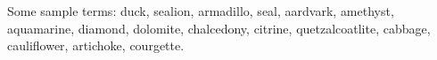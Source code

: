 \documentclass[12pt,a4paper]{article}
\begin{document}
Some sample terms: \gls{duck}, \gls{sealion}, \gls{armadillo},
\gls{seal}, \gls{aardvark}, \gls{amethyst}, \gls{aquamarine},
\gls{diamond}, \gls{dolomite}, \gls{chalcedony}, \gls{citrine},
\gls{quetzalcoatlite}, \gls{cabbage}, \gls{cauliflower},
\gls{artichoke}, \gls{courgette}.

\printunsrtglossary
\end{document}
